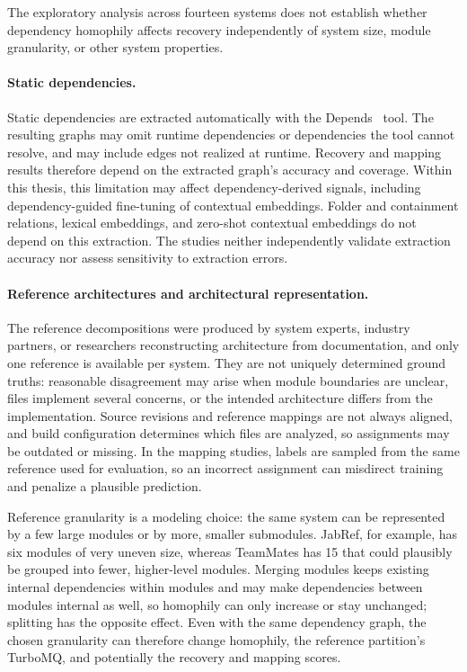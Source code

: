 The exploratory analysis across fourteen systems does not establish whether dependency homophily affects recovery independently of system size, module granularity, or other system properties.

\paragraph{Static dependencies.}
Static dependencies are extracted automatically with the Depends~\cite{depends} tool. The resulting graphs may omit runtime dependencies or dependencies the tool cannot resolve, and may include edges not realized at runtime. Recovery and mapping results therefore depend on the extracted graph's accuracy and coverage. Within this thesis, this limitation may affect dependency-derived signals, including dependency-guided fine-tuning of contextual embeddings. Folder and containment relations, lexical embeddings, and zero-shot contextual embeddings do not depend on this extraction. The studies neither independently validate extraction accuracy nor assess sensitivity to extraction errors.

\paragraph{Reference architectures and architectural representation.}
The reference decompositions were produced by system experts, industry partners, or researchers reconstructing architecture from documentation, and only one reference is available per system. They are not uniquely determined ground truths: reasonable disagreement may arise when module boundaries are unclear, files implement several concerns, or the intended architecture differs from the implementation. Source revisions and reference mappings are not always aligned, and build configuration determines which files are analyzed, so assignments may be outdated or missing. In the mapping studies, labels are sampled from the same reference used for evaluation, so an incorrect assignment can misdirect training and penalize a plausible prediction.

Reference granularity is a modeling choice: the same system can be represented by a few large modules or by more, smaller submodules. JabRef, for example, has six modules of very uneven size, whereas TeamMates has 15 that could plausibly be grouped into fewer, higher-level modules. Merging modules keeps existing internal dependencies within modules and may make dependencies between modules internal as well, so homophily can only increase or stay unchanged; splitting has the opposite effect. Even with the same dependency graph, the chosen granularity can therefore change homophily, the reference partition's TurboMQ, and potentially the recovery and mapping scores.


